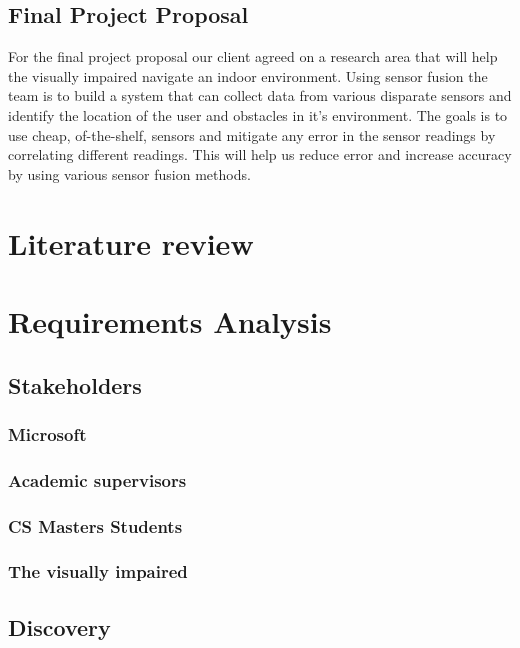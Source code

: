 \documentclass[prodmode,acmtecs]{acmsmall} %
\begin{document}
\subsection{Final Project Proposal}
For the final project proposal our client agreed on a research area that will help the visually impaired navigate an indoor environment.
Using sensor fusion the team is to build a system that can collect data from various disparate sensors and identify the location of the user and obstacles in it's environment.
The goals is to use cheap, of-the-shelf, sensors and mitigate any error in the sensor readings by correlating different readings. This will help us reduce error and increase accuracy by using various sensor fusion methods.
\section{Literature review}

\section{Requirements Analysis}

\subsection{Stakeholders}
\subsubsection{Microsoft}

\subsubsection{Academic supervisors}

\subsubsection{CS Masters Students}

\subsubsection{The visually impaired}

\subsection{Discovery}
\end{document}
